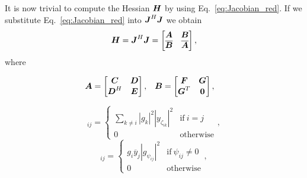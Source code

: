 \documentclass[useAMS,usenatbib]{mn2e}
\newcommand{\bA}{\bmath{A}}
\newcommand{\bB}{\bmath{B}}
\newcommand{\bC}{\bmath{C}}
\newcommand{\bE}{\bmath{E}}
\newcommand{\bF}{\bmath{F}}
\newcommand{\bG}{\bmath{G}}
\newcommand{\bJ}{\bmath{J}}
\newcommand{\bD}{\bmath{D}}
\newcommand{\bH}{\bmath{H}}
\newcommand{\bN}{\bmath{N}}
\newcommand{\bM}{\bmath{M}}
\newcommand{\bzero}{\bmath{0}}
\newcommand{\conj}[1]{\overline{#1}}
\begin{document}

It is now trivial to compute the Hessian $\bH$ by using Eq.~\eqref{eq:Jacobian_red}. If we substitute Eq.~\eqref{eq:Jacobian_red} into $\bJ^H\bJ$
we obtain 
\begin{equation}
\label{eq:red_H}
\bH = \bJ^H\bJ = 
\begin{bmatrix}
\bA & \bB\\
\conj{\bB} & \conj{\bA}
\end{bmatrix},
\end{equation}
where

\begin{align}
\bA &= \begin{bmatrix} \bC & \bD\\ \bD^H & \bE \end{bmatrix}, & \bB &= \begin{bmatrix} \bF & \bG\\ \bG^T & \bzero \end{bmatrix},
\end{align}

\begin{equation}
[\bC]_{ij} = 
\begin{cases}
 \sum_{k \neq i} \left | g_k \right |^2 \left | y_{\zeta_{ik}} \right |^2 & \textrm{if} ~ i=j\\
 0 & \textrm{otherwise}
\end{cases},
\end{equation}
\begin{equation}
[\bD]_{ij} = 
\begin{cases}
 g_i \conj{y}_j  \left | g_{\psi_{ij}} \right |^2  & \textrm{if} ~ \psi_{ij}\neq0\\
 0 & \textrm{otherwise}
\end{cases},
\end{equation}
\end{document}

